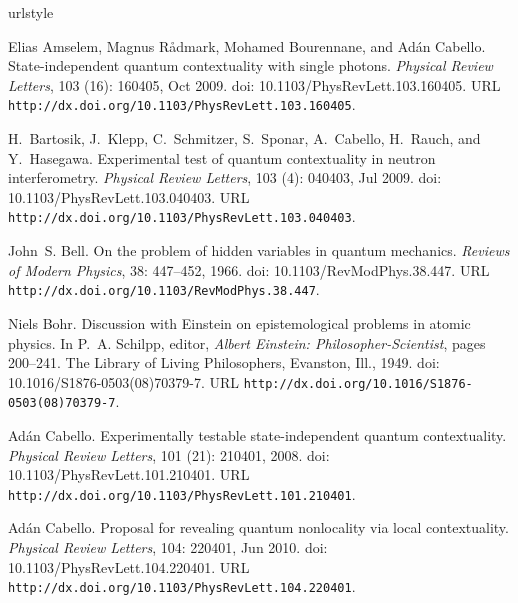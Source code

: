 \documentclass[runningheads]{llncs}
\begin{document}
\begin{thebibliography}{25}
\providecommand{\natexlab}[1]{#1}
\providecommand{\url}[1]{\texttt{#1}}
\expandafter\ifx\csname urlstyle\endcsname\relax
  \providecommand{\doi}[1]{doi: #1}\else
  \providecommand{\doi}{doi: \begingroup \urlstyle{rm}\Url}\fi

Elias Amselem, Magnus R\aa{}dmark, Mohamed Bourennane, and Ad\'an Cabello.
\newblock State-independent quantum contextuality with single photons.
\newblock \emph{Physical Review Letters}, 103 (16): 160405,
  Oct 2009.
\newblock \doi{10.1103/PhysRevLett.103.160405}.
\newblock URL \url{http://dx.doi.org/10.1103/PhysRevLett.103.160405}.

H.~Bartosik, J.~Klepp, C.~Schmitzer, S.~Sponar, A.~Cabello, H.~Rauch, and
  Y.~Hasegawa.
\newblock Experimental test of quantum contextuality in neutron interferometry.
\newblock \emph{Physical Review Letters}, 103 (4): 040403,
  Jul 2009.
\newblock \doi{10.1103/PhysRevLett.103.040403}.
\newblock URL \url{http://dx.doi.org/10.1103/PhysRevLett.103.040403}.

John~S. Bell.
\newblock On the problem of hidden variables in quantum mechanics.
\newblock \emph{Reviews of Modern Physics}, 38: 447--452, 1966.
\newblock \doi{10.1103/RevModPhys.38.447}.
\newblock URL \url{http://dx.doi.org/10.1103/RevModPhys.38.447}.

Niels Bohr.
\newblock Discussion with {E}instein on epistemological problems in atomic
  physics.
\newblock In P.~A. Schilpp, editor, \emph{{A}lbert {E}instein:
  Philosopher-Scientist}, pages 200--241. The Library of Living Philosophers,
  Evanston, Ill., 1949.
\newblock \doi{10.1016/S1876-0503(08)70379-7}.
\newblock URL \url{http://dx.doi.org/10.1016/S1876-0503(08)70379-7}.

Ad\'an Cabello.
\newblock Experimentally testable state-independent quantum contextuality.
\newblock \emph{Physical Review Letters}, 101 (21): 210401,
  2008.
\newblock \doi{10.1103/PhysRevLett.101.210401}.
\newblock URL \url{http://dx.doi.org/10.1103/PhysRevLett.101.210401}.

Ad\'an Cabello.
\newblock Proposal for revealing quantum nonlocality via local contextuality.
\newblock \emph{Physical Review Letters}, 104: 220401, Jun 2010.
\newblock \doi{10.1103/PhysRevLett.104.220401}.
\newblock URL \url{http://dx.doi.org/10.1103/PhysRevLett.104.220401}.


\end{thebibliography}
\end{document}
